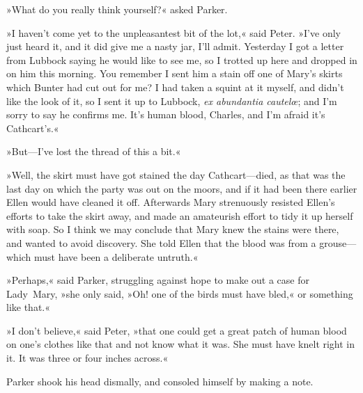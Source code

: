 »What do you really think yourself?« asked Parker.

»I haven't come yet to the unpleasantest bit of the lot,« said Peter. »I've only just heard it, and it did give me a nasty jar, I'll admit.  Yesterday I got a letter from Lubbock saying he would like to see me, so I trotted up here and dropped in on him this morning. You remember I sent him a stain off one of Mary's skirts which Bunter had cut out for me? I had taken a squint at it myself, and didn't like the look of it, so I sent it up to Lubbock, \textit{ex abundantia cautelœ}; and I'm sorry to say he confirms me. It's human blood, Charles, and I'm afraid it's Cathcart's.«

»But—I've lost the thread of this a bit.«

»Well, the skirt must have got stained the day Cathcart—died, as that was the last day on which the party was out on the moors, and if it had been there earlier Ellen would have cleaned it off. Afterwards Mary strenuously resisted Ellen's efforts to take the skirt away, and made an amateurish effort to tidy it up herself with soap. So I think we may conclude that Mary knew the stains were there, and wanted to avoid discovery. She told Ellen that the blood was from a grouse—which must have been a deliberate untruth.«

»Perhaps,« said Parker, struggling against hope to make out a case for Lady~Mary, »she only said, »Oh! one of the birds must have bled,« or something like that.«

»I don't believe,« said Peter, »that one could get a great patch of human blood on one's clothes like that and not know what it was. She must have knelt right in it. It was three or four inches across.«

Parker shook his head dismally, and consoled himself by making a note.

